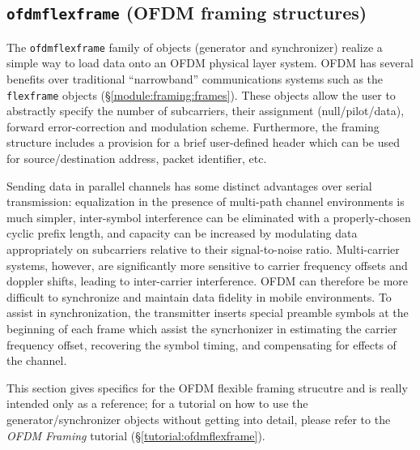 % 
%
\subsection{{\tt ofdmflexframe} (OFDM framing structures)}
\label{module:framing:ofdmflexframe}

The {\tt ofdmflexframe} family of objects (generator and synchronizer)
realize a simple way to load data onto an OFDM physical layer
system. OFDM has several benefits over traditional ``narrowband''
communications systems such as the {\tt flexframe} objects
(\S\ref{module:framing:frames}).
These objects allow the user to abstractly specify the number of
subcarriers, their assignment (null/pilot/data), forward
error-correction and modulation scheme.
Furthermore, the framing structure includes a provision for a brief
user-defined header which can be used for source/destination
address, packet identifier, etc.

Sending data in parallel channels has some distinct advantages over
serial transmission:
equalization in the presence of multi-path channel environments is much
simpler,
inter-symbol interference can be eliminated with a properly-chosen
cyclic prefix length,
and capacity can be increased by modulating data appropriately on
subcarriers relative to their signal-to-noise ratio.
Multi-carrier systems, however, are significantly more sensitive to
carrier frequency offsets and doppler shifts, leading to inter-carrier
interference.
OFDM can therefore be more difficult to synchronize and maintain data
fidelity in mobile environments.
To assist in synchronization, the transmitter inserts special preamble
symbols at the beginning of each frame which assist the syncrhonizer in
estimating the carrier frequency offset,
recovering the symbol timing, and
compensating for effects of the channel.

This section gives specifics for the OFDM flexible framing strucutre and
is really intended only as a reference;
for a tutorial on how to use the generator/synchronizer objects without
getting into detail, please refer to the {\em OFDM Framing} tutorial
(\S\ref{tutorial:ofdmflexframe}).

